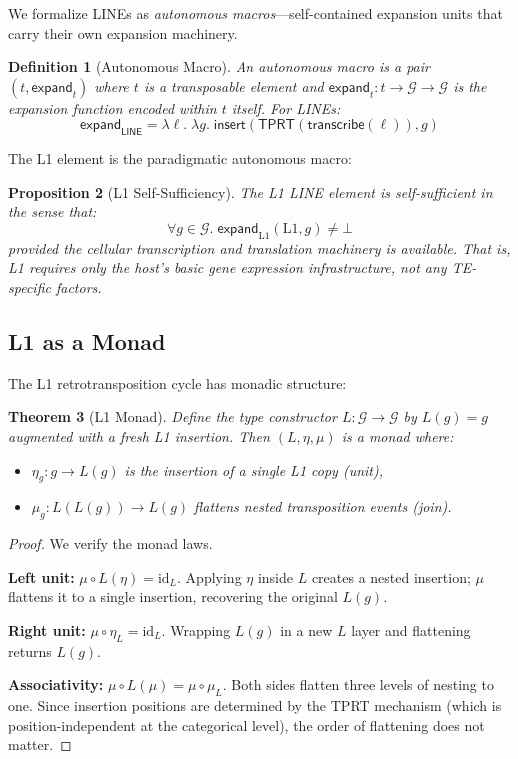 \documentclass[12pt,a4paper]{article}
\newtheorem{theorem}{Theorem}[section]
\newtheorem{proposition}[theorem]{Proposition}
\newtheorem{definition}[theorem]{Definition}
\newcommand{\Genome}{\mathcal{G}}
\newcommand{\LINE}{\mathsf{LINE}}
\newcommand{\id}{\mathrm{id}}
\begin{document}
We formalize LINEs as \emph{autonomous macros}---self-contained expansion units
that carry their own expansion machinery.

\begin{definition}[Autonomous Macro]\label{def:auto-macro}
An \emph{autonomous macro} is a pair $(t, \mathsf{expand}_t)$ where $t$ is a
transposable element and $\mathsf{expand}_t : t \to \Genome \to \Genome$ is the
expansion function encoded within $t$ itself. For LINEs:
\[
  \mathsf{expand}_\LINE = \lambda \ell.\; \lambda g.\;
    \mathsf{insert}(\mathsf{TPRT}(\mathsf{transcribe}(\ell)), g)
\]
\end{definition}

The L1 element is the paradigmatic autonomous macro:

\begin{proposition}[L1 Self-Sufficiency]\label{prop:l1}
The L1 LINE element is \emph{self-sufficient} in the sense that:
\[
  \forall g \in \Genome.\; \mathsf{expand}_{\mathrm{L1}}(\mathrm{L1}, g) \neq \bot
\]
provided the cellular transcription and translation machinery is available. That is,
L1 requires only the host's basic gene expression infrastructure, not any
TE-specific factors.
\end{proposition}

\subsection{L1 as a Monad}

The L1 retrotransposition cycle has monadic structure:

\begin{theorem}[L1 Monad]\label{thm:l1-monad}
Define the type constructor $L : \Genome \to \Genome$ by $L(g) = g$ augmented with a
fresh L1 insertion. Then $(L, \eta, \mu)$ is a monad where:
\begin{itemize}
  \item $\eta_g : g \to L(g)$ is the insertion of a single L1 copy (unit),
  \item $\mu_g : L(L(g)) \to L(g)$ flattens nested transposition events (join).
\end{itemize}
\end{theorem}

\begin{proof}
We verify the monad laws.

\textbf{Left unit:} $\mu \circ L(\eta) = \id_L$.
Applying $\eta$ inside $L$ creates a nested insertion; $\mu$ flattens it to a single
insertion, recovering the original $L(g)$.

\textbf{Right unit:} $\mu \circ \eta_L = \id_L$.
Wrapping $L(g)$ in a new $L$ layer and flattening returns $L(g)$.

\textbf{Associativity:} $\mu \circ L(\mu) = \mu \circ \mu_L$.
Both sides flatten three levels of nesting to one. Since insertion positions are
determined by the TPRT mechanism (which is position-independent at the categorical
level), the order of flattening does not matter.
\end{proof}
\end{document}
